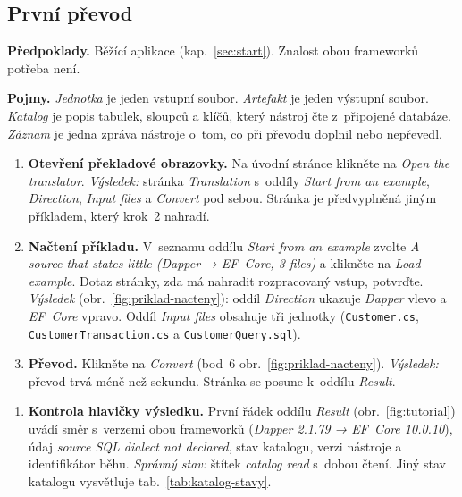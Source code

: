 \FloatBarrier
\subsection{První převod}\label{sec:tutorial}

\textbf{Předpoklady.} Běžící aplikace (kap.~\ref{sec:start}). Znalost obou frameworků potřeba není.

\textbf{Pojmy.} \emph{Jednotka} je jeden vstupní soubor. \emph{Artefakt} je jeden výstupní soubor. \emph{Katalog} je popis tabulek, sloupců a klíčů, který nástroj čte z~připojené databáze. \emph{Záznam} je jedna zpráva nástroje o~tom, co při převodu doplnil nebo nepřevedl.

\begin{enumerate}[leftmargin=*,itemsep=2pt]
\item \textbf{Otevření překladové obrazovky.} Na úvodní stránce klikněte na \emph{Open the translator}. \emph{Výsledek:} stránka \emph{Translation} s~oddíly \emph{Start from an example}, \emph{Direction}, \emph{Input files} a \emph{Convert} pod sebou. Stránka je předvyplněná jiným příkladem, který krok~2 nahradí.
\item \textbf{Načtení příkladu.} V~seznamu oddílu \emph{Start from an example} zvolte \emph{A source that states little (Dapper → EF~Core, 3 files)} a klikněte na \emph{Load example}. Dotaz stránky, zda má nahradit rozpracovaný vstup, potvrďte. \emph{Výsledek} (obr.~\ref{fig:priklad-nacteny}): oddíl \emph{Direction} ukazuje \emph{Dapper} vlevo a \emph{EF~Core} vpravo. Oddíl \emph{Input files} obsahuje tři jednotky (\texttt{Customer.cs}, \texttt{CustomerTransaction.cs} a \texttt{CustomerQuery.sql}).
\item \textbf{Převod.} Klikněte na \emph{Convert} (bod~6 obr.~\ref{fig:priklad-nacteny}). \emph{Výsledek:} převod trvá méně než sekundu. Stránka se posune k~oddílu \emph{Result}.
\end{enumerate}


\begin{enumerate}[resume,leftmargin=*,itemsep=2pt]
\item \textbf{Kontrola hlavičky výsledku.} První řádek oddílu \emph{Result} (obr.~\ref{fig:tutorial}) uvádí směr s~verzemi obou frameworků (\emph{Dapper 2.1.79 → EF~Core 10.0.10}), údaj \emph{source SQL dialect not declared}, stav katalogu, verzi nástroje a identifikátor běhu. \emph{Správný stav:} štítek \emph{catalog read} s~dobou čtení. Jiný stav katalogu vysvětluje tab.~\ref{tab:katalog-stavy}.
\end{enumerate}

